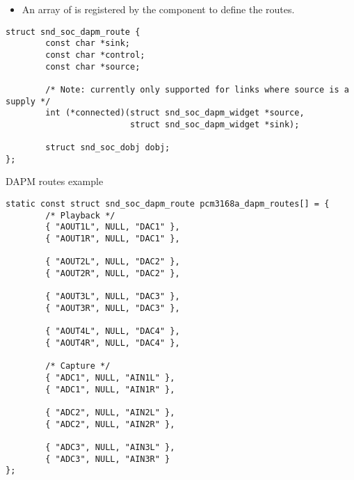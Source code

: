 \begin{frame}[fragile]{}
  \begin{itemize}
  \item An array of  is registered
    by the component to define the routes.
  \end{itemize}
  \begin{block}{}
    \fontsize{9}{9}\selectfont
    \begin{verbatim}
struct snd_soc_dapm_route {
        const char *sink;
        const char *control;
        const char *source;

        /* Note: currently only supported for links where source is a supply */
        int (*connected)(struct snd_soc_dapm_widget *source,
                         struct snd_soc_dapm_widget *sink);

        struct snd_soc_dobj dobj;
};
    \end{verbatim}
  \end{block}
\end{frame}

\begin{frame}[fragile]{DAPM routes example}
  \begin{block}{}
    \fontsize{8}{7}\selectfont
    \begin{verbatim}
static const struct snd_soc_dapm_route pcm3168a_dapm_routes[] = {
        /* Playback */
        { "AOUT1L", NULL, "DAC1" },
        { "AOUT1R", NULL, "DAC1" },

        { "AOUT2L", NULL, "DAC2" },
        { "AOUT2R", NULL, "DAC2" },

        { "AOUT3L", NULL, "DAC3" },
        { "AOUT3R", NULL, "DAC3" },

        { "AOUT4L", NULL, "DAC4" },
        { "AOUT4R", NULL, "DAC4" },

        /* Capture */
        { "ADC1", NULL, "AIN1L" },
        { "ADC1", NULL, "AIN1R" },

        { "ADC2", NULL, "AIN2L" },
        { "ADC2", NULL, "AIN2R" },

        { "ADC3", NULL, "AIN3L" },
        { "ADC3", NULL, "AIN3R" }
};
    \end{verbatim}
  \end{block}
\end{frame}


